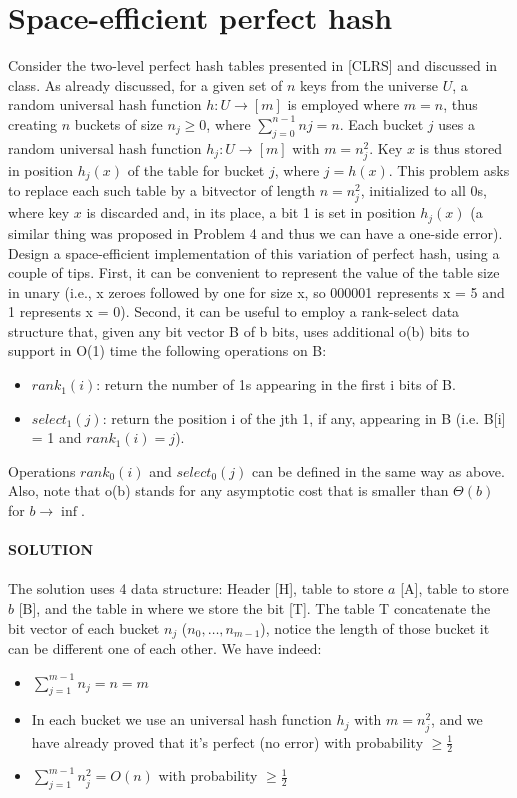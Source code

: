 \documentclass[a4paper]{article}
\begin{document}
\section*{Space-efficient perfect hash}
Consider the two-level perfect hash tables presented in [CLRS] and discussed in class. As already discussed, for a given set of $n$ keys from
the universe $U$, a random universal hash function $h : U \rightarrow [m]$ is employed where $m = n$, thus creating $n$ buckets of size $n_j \geq 0$, where $\sum^{n−1}_{j=0} nj = n$. Each bucket $j$ uses a random universal hash function $h_j: U \rightarrow [m]$ with $m = n_j^2$. Key $x$ is thus stored in
position $h_j (x)$ of the table for bucket $j$, where $j = h(x)$.
This problem asks to replace each such table by a bitvector of length $n=n_j^2$, initialized to all 0s, where key $x$ is discarded and, in its place, a bit 1 is set in position $h_j (x)$ (a similar thing was proposed in Problem 4 and thus we can have a one-side error). Design
a space-efficient implementation of this variation of perfect hash, using a couple of tips. First, it can be convenient to represent the value of the table size in unary (i.e., x zeroes followed by one for size x, so 000001 represents x = 5 and 1 represents x = 0). Second, it can be useful to employ a rank-select data structure that, given any bit vector B of b bits, uses additional o(b) bits to support in O(1) time the following operations on B:
\begin{itemize}
\item $rank_1(i)$: return the number of 1s appearing in the first i bits of B.
\item $select_1(j)$: return the position i of the jth 1, if any, appearing in B (i.e. B[i] = 1 and $rank_1(i) = j$).
\end{itemize}
Operations $rank_0(i)$ and $select_0(j)$ can be defined in the same way as above. Also, note that o(b) stands for any asymptotic cost that is smaller than $\Theta(b)$ for $b \rightarrow \inf$.
\\
\\
\textbf{SOLUTION}
\\
\\
The solution uses 4 data structure: Header [H], table to store $a$ [A], table to store $b$ [B], and the table in where we store the bit [T]. The table T concatenate the bit vector of each bucket $n_j$ ($n_0,\dots ,n_{m-1}$), notice the length of those bucket it can be different one of each other. We have indeed:
\begin{itemize}
\item $\sum_{j=1}^{m-1}n_j=n=m$
\item In each bucket we use an universal hash function $h_j$ with $m=n_j^2$, and we have already proved that it's perfect (no error) with probability $\geq \frac{1}{2}$
\item $\sum_{j=1}^{m-1}n_j^2=O(n)$ with probability $\geq \frac{1}{2}$
\end{itemize}
\end{document}
